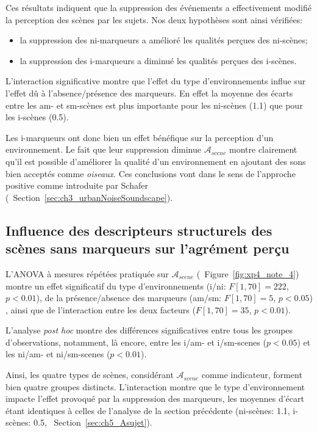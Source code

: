 Ces résultats indiquent que la suppression des événements a effectivement modifié la perception des scènes par les sujets. Nos deux hypothèses sont ainsi vérifiées:

\begin{itemize}
\item la suppression des ni-marqueurs a amélioré les qualités perçues des ni-scènes;
\item la suppression des i-marqueurs a diminué les qualités perçues des i-scènes.
\end{itemize}

L'interaction significative montre que l'effet du type d'environnements influe sur l'effet dû à l'absence/présence des marqueurs. En effet la moyenne des écarts entre les am- et sm-scènes est plus importante pour les ni-scènes (1.1) que pour les i-scènes (0.5). 

Les i-marqueurs ont donc bien un effet bénéfique sur la perception d'un environnement. Le fait que leur suppression diminue $\mathcal{A}_{scene}$ montre clairement qu'il est possible d'améliorer la qualité d'un environnement en ajoutant des sons bien acceptés comme \emph{oiseaux}. Ces conclusions vont dans le sens de l'approche positive comme introduite par Schafer \citep{schafer1977tuning} (\cf~Section~\ref{sec:ch3_urbanNoiseSoundscape}). \\


\subsection{Influence des descripteurs structurels des scènes sans marqueurs sur l'agrément perçu}

L'ANOVA à mesures répétées pratiquée sur $\mathcal{A}_{scene}$ (\cf~Figure~\ref{fig:xp4_note_4}) montre un effet significatif du type d'environnements (i/ni: $F[1,70]=222$, $p<0.01$), de la présence/absence des marqueurs (am/sm: $F[1,70]=5$, $p<0.05$) , ainsi que de l'interaction entre les deux facteurs ($F[1,70]=35$, $p<0.01$).

L'analyse \emph{post hoc} montre des différences significatives entre tous les groupes d'observations, notamment, là encore, entre les i/am- et i/sm-scenes ($p<0.05$) et les ni/am- et ni/sm-scenes ($p<0.01$).

Ainsi, les quatre types de scènes, considérant $\mathcal{A}_{scene}$ comme indicateur, forment bien quatre groupes distincts. L'interaction montre que le type d'environnement impacte l'effet provoqué par la suppression des marqueurs, les moyennes d'écart étant identiques à celles de l'analyse de la section précédente (ni-scènes: 1.1,  i-scènes: 0.5, \cf~Section~\ref{sec:ch5_Asujet}). \\
 
